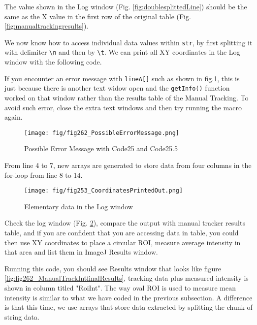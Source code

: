 \documentclass[11pt,a4paper,oneside]{report}
\newcommand{\ilcom}[1]{\texttt{\small#1}}
\begin{document}
The value shown in the Log window (Fig. \ref{fig:doublesplittedLine}) 
should be the same as the X value in the first row of the original table (Fig. \ref{fig:manualtrackingresults}). 

We now know how to access individual data values within \ilcom{str}, 
by first splitting it with delimiter \ilcom{\textbackslash{}n} and then by
\ilcom{\textbackslash{}t}. We can print all XY coordinates in the Log window with the following code.  



If you encounter an error message with \ilcom{lineA[]} such as shown in fig.\ref{fig:fig262_ErrorMessage}, 
this is just because there is another text widow open and the \ilcom{getInfo()} function worked on 
that window rather than the results table of the Manual Tracking. To avoid such error, 
close the extra text windows and then try running the macro again. 
\begin{figure}[htbp]
\begin{center}
\texttt{[image: fig/fig262\_PossibleErrorMessage.png]}
\caption{Possible Error Message with Code25 and Code25.5}
\label{fig:fig262_ErrorMessage}
\end{center}
\end{figure}

From line 4 to 7, new arrays are generated to store data from four columns in the for-loop from line 8 to 14. 

\begin{figure}[htbp]
\begin{center}
\texttt{[image: fig/fig253\_CoordinatesPrintedOut.png]}
\caption{Elementary data in the Log window}
\label{fig:fig253_CoordinatesPrintedOut}
\end{center}
\end{figure}

Check the log window (Fig. \ref{fig:fig253_CoordinatesPrintedOut}), 
compare the output with manual tracker results table, and if you are confident that you are accessing data in table, 
you could then use XY coordinates to place a circular ROI, 
measure average intensity in that area and list them in ImageJ Results window.



Running this code, you should see Results window that looks like figure 
\ref{fig:fig262_ManualTrackIntfinalResults}, tracking data plus measured intensity is shown in 
column titled "RoiInt". The way oval ROI is used to measure mean intensity is similar to what 
we have coded in the previous subsection. A difference is that this time, we use arrays that store data 
extracted by splitting the chunk of string data. 
\end{document}
